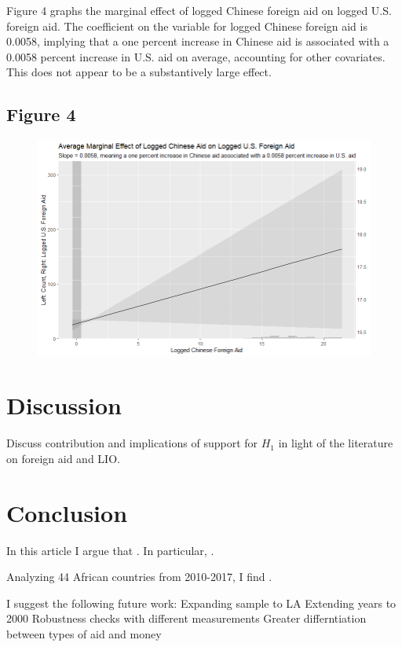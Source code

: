 \documentclass[12pt]{article}
\begin{document}
\pagebreak
Figure 4 graphs the marginal effect of logged Chinese foreign aid on logged U.S. foreign aid. The coefficient on the variable for logged Chinese foreign aid is 0.0058, implying that a one percent increase in Chinese aid is associated with a 0.0058 percent increase in U.S. aid on average, accounting for other covariates. This does not appear to be a substantively large effect.

\subsection*{Figure 4}
\begin{figure}[htbp]
    \includegraphics[scale=0.7]{Figures/628plot2.png}
\end{figure}
\pagebreak 

\section*{Discussion}
Discuss contribution and implications of support for $H_1$ in light of the literature on foreign aid and LIO.



\section*{Conclusion}
In this article I argue that . In particular, .

Analyzing 44 African countries from 2010-2017, I find .

I suggest the following future work: Expanding sample to LA Extending years to 2000 Robustness checks with different measurements Greater differntiation between types of aid and money 

\nocite{mechkova2022a}
\nocite{pemstein2022}
\nocite{coppedge2022}
\nocite{coppedge2022a}
\nocite{coppedge2022b}
\nocite{coppedge2022c}
\nocite{coppedge2022d}
\nocite{curini2020}
\pagebreak
\printbibliography
\end{document}
